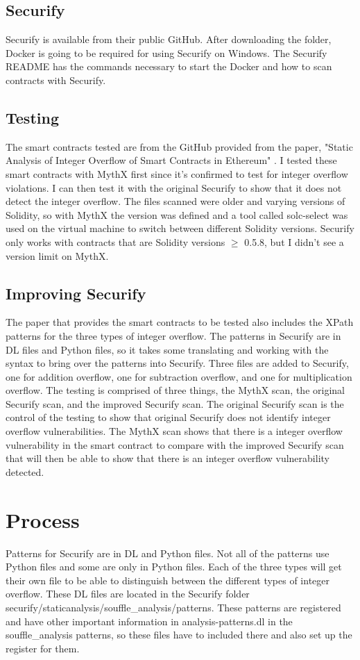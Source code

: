 \documentclass{article}
\begin{document}
\subsection{Securify}
Securify is available from their public GitHub. After downloading the folder, Docker is going to be required for using Securify on Windows. The Securify README has the commands necessary to start the Docker and how to scan contracts with Securify. 
\subsection{Testing}
The smart contracts tested are from the GitHub \cite{StaticTestCases} provided from the paper, "Static Analysis of Integer Overflow of Smart Contracts in Ethereum" \cite{Static}. I tested these smart contracts with MythX first since it's confirmed to test for integer overflow violations. I can then test it with the original Securify \cite{Securify} to show that it does not detect the integer overflow. The files scanned were older and varying versions of Solidity, so with MythX the version was defined and a tool called solc-select \cite{SolcSelect} was used on the virtual machine to switch between different Solidity versions. Securify only works with contracts that are Solidity versions $\geq$ 0.5.8, but I didn't see a version limit on MythX.
\subsection{Improving Securify}
The paper that provides the smart contracts to be tested also includes the XPath patterns for the three types of integer overflow. The patterns in Securify are in DL files and Python files, so it takes some translating and working with the syntax to bring over the patterns into Securify. Three files are added to Securify, one for addition overflow, one for subtraction overflow, and one for multiplication overflow. The testing is comprised of three things, the MythX scan, the original Securify scan, and the improved Securify scan. The original Securify scan is the control of the testing to show that original Securify does not identify integer overflow vulnerabilities. The MythX scan shows that there is a integer overflow vulnerability in the smart contract to compare with the improved Securify scan that will then be able to show that there is an integer overflow vulnerability detected.

\section{Process}
Patterns for Securify are in DL and Python files. Not all of the patterns use Python files and some are only in Python files. Each of the three types will get their own file to be able to distinguish between the different types of integer overflow. These DL files are located in the Securify folder securify/staticanalysis/souffle\_analysis/patterns. These patterns are registered and have other important information in analysis-patterns.dl in the souffle\_analysis patterns, so these files have to included there and also set up the register for them.
\end{document}
